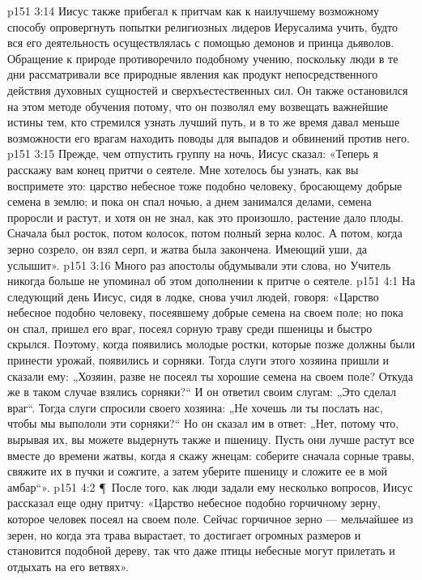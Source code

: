 \vs p151 3:14 Иисус также прибегал к притчам как к наилучшему возможному способу опровергнуть попытки религиозных лидеров Иерусалима учить, будто вся его деятельность осуществлялась с помощью демонов и принца дьяволов. Обращение к природе противоречило подобному учению, поскольку люди в те дни рассматривали все природные явления как продукт непосредственного действия духовных сущностей и сверхъестественных сил. Он также остановился на этом методе обучения потому, что он позволял ему возвещать важнейшие истины тем, кто стремился узнать лучший путь, и в то же время давал меньше возможности его врагам находить поводы для выпадов и обвинений против него.
\vs p151 3:15 Прежде, чем отпустить группу на ночь, Иисус сказал: «Теперь я расскажу вам конец притчи о сеятеле. Мне хотелось бы узнать, как вы воспримете это: царство небесное тоже подобно человеку, бросающему добрые семена в землю; и пока он спал ночью, а днем занимался делами, семена проросли и растут, и хотя он не знал, как это произошло, растение дало плоды. Сначала был росток, потом колосок, потом полный зерна колос. А потом, когда зерно созрело, он взял серп, и жатва была закончена. Имеющий уши, да услышит».
\vs p151 3:16 Много раз апостолы обдумывали эти слова, но Учитель никогда больше не упоминал об этом дополнении к притче о сеятеле.
\vs p151 4:1 На следующий день Иисус, сидя в лодке, снова учил людей, говоря: «Царство небесное подобно человеку, посеявшему добрые семена на своем поле; но пока он спал, пришел его враг, посеял сорную траву среди пшеницы и быстро скрылся. Поэтому, когда появились молодые ростки, которые позже должны были принести урожай, появились и сорняки. Тогда слуги этого хозяина пришли и сказали ему: „Хозяин, разве не посеял ты хорошие семена на своем поле? Откуда же в таком случае взялись сорняки?“ И он ответил своим слугам: „Это сделал враг“. Тогда слуги спросили своего хозяина: „Не хочешь ли ты послать нас, чтобы мы выпололи эти сорняки?“ Но он сказал им в ответ: „Нет, потому что, вырывая их, вы можете выдернуть также и пшеницу. Пусть они лучше растут все вместе до времени жатвы, когда я скажу жнецам: соберите сначала сорные травы, свяжите их в пучки и сожгите, а затем уберите пшеницу и сложите ее в мой амбар“».
\vs p151 4:2 \P\ После того, как люди задали ему несколько вопросов, Иисус рассказал еще одну притчу: «Царство небесное подобно горчичному зерну, которое человек посеял на своем поле. Сейчас горчичное зерно --- мельчайшее из зерен, но когда эта трава вырастает, то достигает огромных размеров и становится подобной дереву, так что даже птицы небесные могут прилетать и отдыхать на его ветвях».
